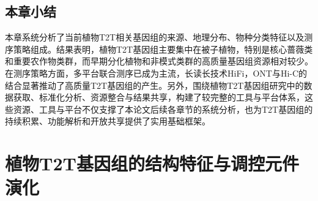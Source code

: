 




\section{本章小结}
本章系统分析了当前植物T2T相关基因组的来源、地理分布、物种分类特征以及测序策略组成。结果表明，植物T2T基因组主要集中在被子植物，特别是核心蔷薇类和重要农作物类群，而早期分化植物和非模式类群的高质量基因组资源相对较少。在测序策略方面，多平台联合测序已成为主流，长读长技术HiFi，ONT与Hi-C的结合显著推动了高质量T2T基因组的产生。另外，围绕植物T2T基因组研究中的数据获取、标准化分析、资源整合与结果共享，构建了较完整的工具与平台体系，这些资源、工具与平台不仅支撑了本论文后续各章节的系统分析，也为T2T基因组的持续积累、功能解析和开放共享提供了实用基础框架。

\chapter{植物T2T基因组的结构特征与调控元件演化}

